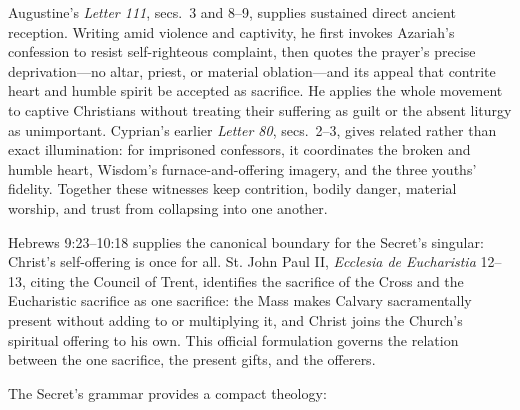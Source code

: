 \begin{deepstudy}
Augustine's \emph{Letter 111}, secs.~3 and 8--9, supplies sustained direct ancient reception. Writing amid violence and captivity, he first invokes Azariah's confession to resist self-righteous complaint, then quotes the prayer's precise deprivation---no altar, priest, or material oblation---and its appeal that contrite heart and humble spirit be accepted as sacrifice. He applies the whole movement to captive Christians without treating their suffering as guilt or the absent liturgy as unimportant. Cyprian's earlier \emph{Letter 80}, secs.~2--3, gives related rather than exact illumination: for imprisoned confessors, it coordinates the broken and humble heart, Wisdom's furnace-and-offering imagery, and the three youths' fidelity. Together these witnesses keep contrition, bodily danger, material worship, and trust from collapsing into one another.

Hebrews 9:23--10:18 supplies the canonical boundary for the Secret's singular: Christ's self-offering is once for all. St. John Paul II, \emph{Ecclesia de Eucharistia} 12--13, citing the Council of Trent, identifies the sacrifice of the Cross and the Eucharistic sacrifice as one sacrifice: the Mass makes Calvary sacramentally present without adding to or multiplying it, and Christ joins the Church's spiritual offering to his own. This official formulation governs the relation between the one sacrifice, the present gifts, and the offerers.

The Secret's grammar provides a compact theology:


\end{deepstudy}
